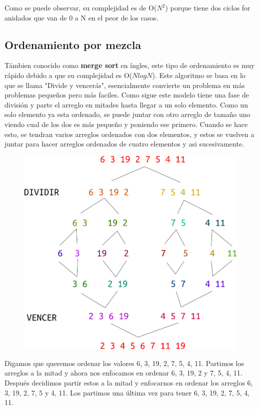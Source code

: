 \documentclass{article}
\begin{document}
Como se puede observar, su complejidad es de O($N^2$) porque tiene dos ciclos for anidados que van de 0 a N en el peor de los casos.

\subsection{Ordenamiento por mezcla}

Támbien conocido como \textbf{merge sort} en íngles, este tipo de ordenamiento es muy rápido debido a que su complejidad es O($N log N$). Este algoritmo se basa en lo que se llama "Divide y vencerás", esencialmente convierte un problema en más problemas pequeños pero más faciles. Como sigue este modelo tiene una fase de división y parte el arreglo en mitades hasta llegar a un solo elemento. Como un solo elemento ya esta ordenado, se puede juntar con otro arreglo de tamaño uno viendo cual de los dos es más pequeño y poniendo ese primero. Cuando se hace esto, se tendran varios arreglos ordenados con dos elementos, y estos se vuelven a juntar para hacer arreglos ordenados de cuatro elementos y asi sucesivamente.

\begin{figure}[H]
    \centering
    \includegraphics[width=0.4\paperwidth]{mergesort}
\end{figure}

Digamos que queremos ordenar los valores {6, 3, 19, 2, 7, 5, 4, 11}. Partimos los arreglos a la mitad y ahora nos enfocamos en ordenar {6, 3, 19, 2} y {7, 5, 4, 11}. Después decidimos partir estos a la mitad y enfocarnos en ordenar los arreglos {6, 3}, {19, 2}, {7, 5} y {4, 11}. Los partimos una última vez para tener {6}, {3}, {19}, {2}, {7}, {5}, {4}, {11}.
\end{document}
